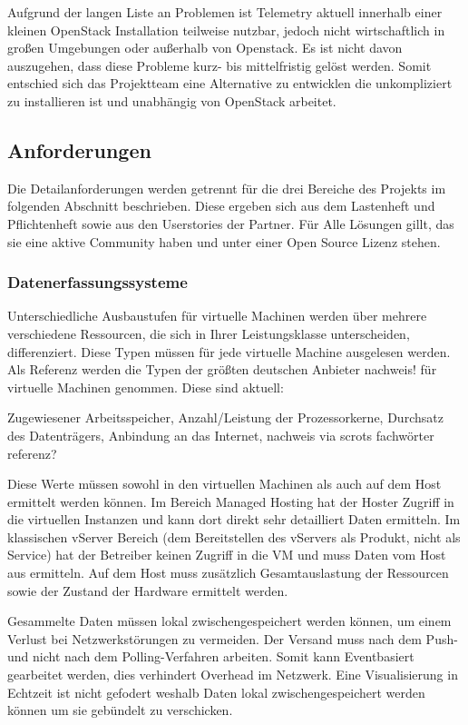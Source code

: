 Aufgrund der langen Liste an Problemen ist Telemetry aktuell innerhalb einer
kleinen OpenStack Installation teilweise nutzbar, jedoch nicht wirtschaftlich
in großen Umgebungen oder außerhalb von Openstack. Es ist nicht davon
auszugehen, dass diese Probleme kurz- bis mittelfristig gelöst werden. Somit
entschied sich das Projektteam eine Alternative zu entwicklen die unkompliziert
zu installieren ist und unabhängig von OpenStack arbeitet.
\tm%

\subsection{Anforderungen}
Die Detailanforderungen werden getrennt für die drei Bereiche des Projekts im
folgenden Abschnitt beschrieben. Diese ergeben sich aus dem Lastenheft und
Pflichtenheft sowie aus den Userstories der Partner. Für Alle Lösungen gillt,
das sie eine aktive Community haben und unter einer Open Source Lizenz stehen.
\tm%

\subsubsection{Datenerfassungssysteme}
Unterschiedliche Ausbaustufen für virtuelle Machinen werden über mehrere
verschiedene Ressourcen, die sich in Ihrer Leistungsklasse unterscheiden,
differenziert. Diese Typen müssen für jede virtuelle Machine ausgelesen werden.
Als Referenz werden die Typen der größten deutschen Anbieter nachweis! für
virtuelle Machinen genommen. Diese sind aktuell:

Zugewiesener Arbeitsspeicher, Anzahl/Leistung der Prozessorkerne, Durchsatz des
Datenträgers, Anbindung an das Internet, nachweis via scrots fachwörter
referenz?

Diese Werte müssen sowohl in den virtuellen Machinen als auch auf dem Host
ermittelt werden können. Im Bereich Managed Hosting hat der Hoster Zugriff in
die virtuellen Instanzen und kann dort direkt sehr detailliert Daten ermitteln.
Im klassischen vServer Bereich (dem Bereitstellen des vServers als Produkt,
nicht als Service) hat der Betreiber keinen Zugriff in die VM und muss Daten
vom Host aus ermitteln. Auf dem Host muss zusätzlich Gesamtauslastung der
Ressourcen sowie der Zustand der Hardware ermittelt werden.

Gesammelte Daten müssen lokal zwischengespeichert werden können, um einem
Verlust bei Netzwerkstörungen zu vermeiden. Der Versand muss nach dem Push- und
nicht nach dem Polling-Verfahren arbeiten. Somit kann Eventbasiert gearbeitet
werden, dies verhindert Overhead im Netzwerk. Eine Visualisierung in Echtzeit
ist nicht gefodert weshalb Daten lokal zwischengespeichert werden können um sie
gebündelt zu verschicken.
\tm%

